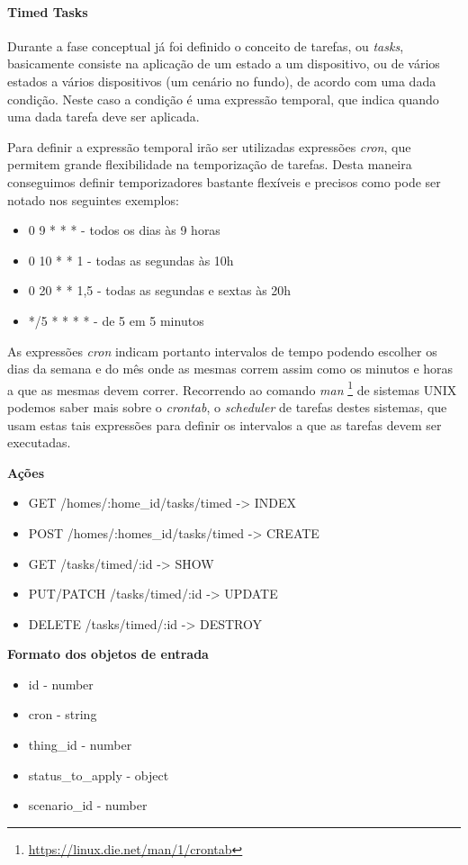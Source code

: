 \paragraph*{Timed Tasks}

Durante a fase conceptual já foi definido o conceito de tarefas, ou \textit{tasks}, basicamente consiste na aplicação de um estado a um dispositivo, ou de vários estados a vários dispositivos (um cenário no fundo), de acordo com uma dada condição. Neste caso a condição é uma expressão temporal, que indica quando uma dada tarefa deve ser aplicada.

Para definir a expressão temporal irão ser utilizadas expressões \textit{cron}, que permitem grande flexibilidade na temporização de tarefas. Desta maneira conseguimos definir temporizadores bastante flexíveis e precisos como pode ser notado nos seguintes exemplos:
\begin{itemize}
    \item 0 9 * * * - todos os dias às 9 horas
    \item 0 10 * * 1 - todas as segundas às 10h
    \item 0 20 * * 1,5 - todas as segundas e sextas às 20h
    \item */5 * * * * - de 5 em 5 minutos
\end{itemize}

As expressões \textit{cron} indicam portanto intervalos de tempo podendo escolher os dias da semana e do mês onde as mesmas correm assim como os minutos e horas a que as mesmas devem correr. Recorrendo ao comando \textit{man} \footnote{\url{https://linux.die.net/man/1/crontab}} de sistemas UNIX podemos saber mais sobre o \textit{crontab}, o \textit{scheduler} de tarefas destes sistemas, que usam estas tais expressões para definir os intervalos a que as tarefas devem ser executadas.

\textbf{Ações}
\begin{itemize}
    \item GET /homes/:home{\_}id/tasks/timed -> INDEX
    \item POST /homes/:homes{\_}id/tasks/timed -> CREATE
    \item GET /tasks/timed/:id -> SHOW
    \item PUT/PATCH /tasks/timed/:id -> UPDATE
    \item DELETE /tasks/timed/:id -> DESTROY
\end{itemize}

\textbf{Formato dos objetos de entrada}
\begin{itemize}
    \item id - number
    \item cron - string
    \item thing{\_}id - number 
    \item status{\_}to{\_}apply - object
    \item scenario{\_}id - number
\end{itemize}

